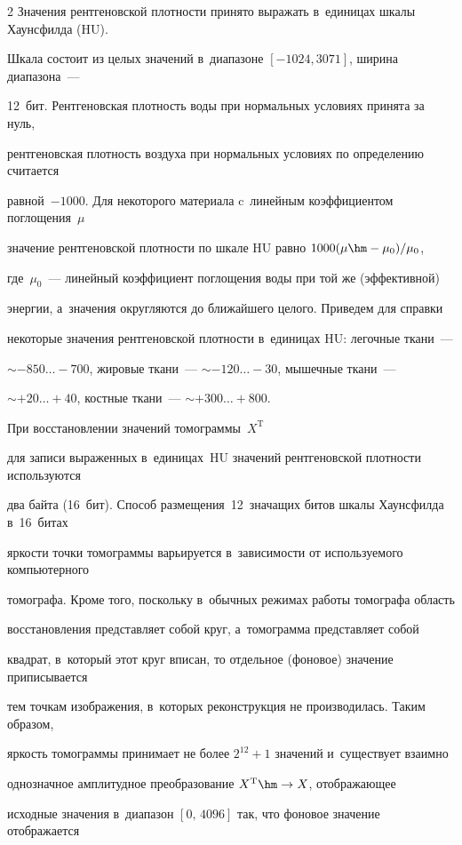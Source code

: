 \begin{multicols}{2}
Значения рентгеновской плотности принято выражать в~единицах шкалы Хаунсфилда (HU). 

Шкала состоит из целых значений в~диапазоне $[-1024, 3071]$, ширина диапазона~--- 

12~бит. Рентгеновская плотность воды при нормальных условиях принята за нуль, 

рентгеновская плотность воздуха при нормальных условиях по определению считается 

равной~$-1000$. Для некоторого материала c~линейным коэффициентом поглощения~$\mu$ 

значение рентгеновской плотности по шкале HU равно $1000(\mu\hm-\mu_0)/\mu_0$, 

где~$\mu_0$~--- линейный коэффициент поглощения воды при той же (эффективной) 

энергии, а~значения округляются до ближайшего целого. Приведем для справки 

некоторые значения рентгеновской плотности в~единицах HU: легочные ткани~---  

$\sim-850\ldots-700$, жировые ткани~--- $\sim-120\ldots-30$, мышечные ткани~--- 

$\sim+20\ldots+40$, костные ткани~--- $\sim+300\ldots+800$.



При восстановлении значений томограммы~$X^{\mathrm{T}}$ 

для записи выраженных в~единицах~HU значений рентгеновской плотности используются 

два байта (16~бит). Способ размещения~12~значащих битов шкалы Хаунсфилда в~16~битах 

яр\-кости точки томограммы варьируется в~зависимости от используемого компьютерного 

томографа. Кроме того, поскольку в~обычных режимах работы томографа область 

восстановления представляет собой круг, а~томограмма представляет собой 

квадрат, в~который этот круг вписан, то отдельное (фоновое) значение приписывается 

тем точкам изображения, в~которых реконструкция не производилась. Таким образом, 

яркость томограммы принимает не более $2^{12}+1$ значений и~существует взаимно 

однозначное амплитудное преобразование  $X^{\mathrm{T}}\hm\to X$, отоб\-ра\-жа\-ющее 

исходные значения в~диапазон $[0,\,4096]$ так, что фоновое значение отоб\-ра\-жа\-ет\-ся 


\end{multicols}
